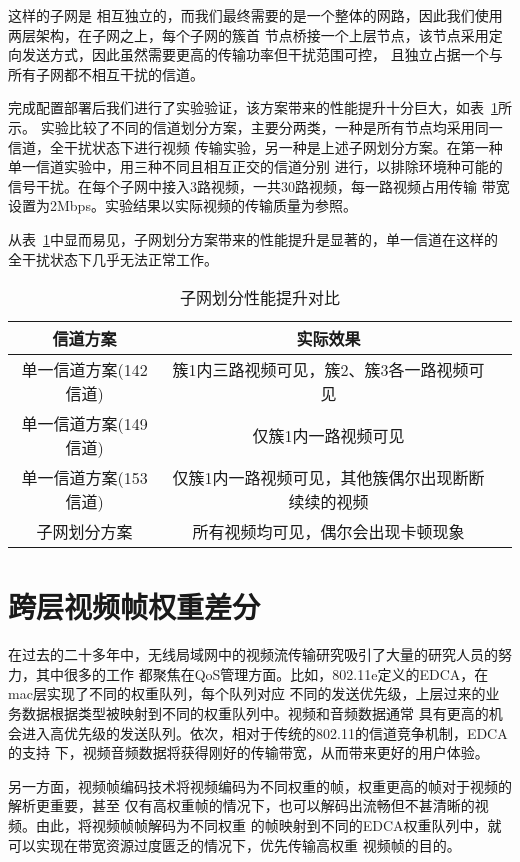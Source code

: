 这样的子网是
相互独立的，而我们最终需要的是一个整体的网路，因此我们使用两层架构，在子网之上，每个子网的簇首
节点桥接一个上层节点，该节点采用定向发送方式，因此虽然需要更高的传输功率但干扰范围可控，
且独立占据一个与所有子网都不相互干扰的信道。

完成配置部署后我们进行了实验验证，该方案带来的性能提升十分巨大，如表~\ref{tab:subnet_comp}所示。
实验比较了不同的信道划分方案，主要分两类，一种是所有节点均采用同一信道，全干扰状态下进行视频
传输实验，另一种是上述子网划分方案。在第一种单一信道实验中，用三种不同且相互正交的信道分别
进行，以排除环境种可能的信号干扰。在每个子网中接入3路视频，一共30路视频，每一路视频占用传输
带宽设置为2Mbps。实验结果以实际视频的传输质量为参照。

从表~\ref{tab:subnet_comp}中显而易见，子网划分方案带来的性能提升是显著的，单一信道在这样的
全干扰状态下几乎无法正常工作。
\begin{table}[htbp]
  \centering
  \caption{子网划分性能提升对比}
  \label{tab:subnet_comp}
  \begin{tabular}{|c|c|c|}
  \hline
  信道方案 & 实际效果 \\
  \hline
  单一信道方案(142信道) & 簇1内三路视频可见，簇2、簇3各一路视频可见 \\
  \hline
  单一信道方案(149信道) & 仅簇1内一路视频可见 \\
  \hline
  单一信道方案(153信道) & 仅簇1内一路视频可见，其他簇偶尔出现断断续续的视频 \\
  \hline
  子网划分方案 & 所有视频均可见，偶尔会出现卡顿现象 \\
  \hline
  \end{tabular}
\end{table}

\section{跨层视频帧权重差分}
在过去的二十多年中，无线局域网中的视频流传输研究吸引了大量的研究人员的努力，其中很多的工作
都聚焦在QoS管理方面。比如，802.11e定义的EDCA，在mac层实现了不同的权重队列，每个队列对应
不同的发送优先级，上层过来的业务数据根据类型被映射到不同的权重队列中。视频和音频数据通常
具有更高的机会进入高优先级的发送队列。依次，相对于传统的802.11的信道竞争机制，EDCA的支持
下，视频音频数据将获得刚好的传输带宽，从而带来更好的用户体验。

另一方面，视频帧编码技术将视频编码为不同权重的帧，权重更高的帧对于视频的解析更重要，甚至
仅有高权重帧的情况下，也可以解码出流畅但不甚清晰的视频。由此，将视频帧帧解码为不同权重
的帧映射到不同的EDCA权重队列中，就可以实现在带宽资源过度匮乏的情况下，优先传输高权重
视频帧的目的。

